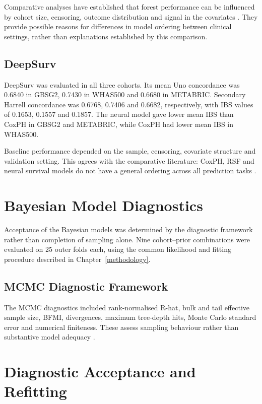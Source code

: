 Comparative analyses have established that forest performance can be influenced by cohort size, censoring, outcome distribution and signal in the covariates \cite{ref33,ref37}. They provide possible reasons for differences in model ordering between clinical settings, rather than explanations established by this comparison.

\subsection{DeepSurv}\label{deepsurv-1}

DeepSurv was evaluated in all three cohorts. Its mean Uno concordance was 0.6840 in GBSG2, 0.7430 in WHAS500 and 0.6680 in METABRIC. Secondary Harrell concordance was 0.6768, 0.7406 and 0.6682, respectively, with IBS values of 0.1653, 0.1557 and 0.1857. The neural model gave lower mean IBS than CoxPH in GBSG2 and METABRIC, while CoxPH had lower mean IBS in WHAS500.

Baseline performance depended on the sample, censoring, covariate structure and validation setting. This agrees with the comparative literature: CoxPH, RSF and neural survival models do not have a general ordering across all prediction tasks \cite{ref33,ref44}.

\section{Bayesian Model Diagnostics}\label{bayesian-model-diagnostics}

Acceptance of the Bayesian models was determined by the diagnostic framework rather than completion of sampling alone. Nine cohort--prior combinations were evaluated on 25 outer folds each, using the common likelihood and fitting procedure described in Chapter~\ref{methodology}.

\subsection{MCMC Diagnostic Framework}\label{mcmc-diagnostic-framework}

The MCMC diagnostics included rank-normalised R-hat, bulk and tail effective sample size, BFMI, divergences, maximum tree-depth hits, Monte Carlo standard error and numerical finiteness. These assess sampling behaviour rather than substantive model adequacy \cite{ref39}.

\section{Diagnostic Acceptance and Refitting}\label{recovery-attempt-ledger}

